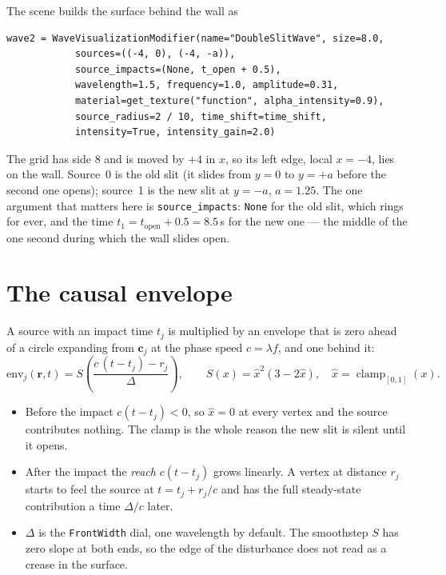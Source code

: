 \documentclass[11pt,a4paper]{article}
\newcommand{\node}[1]{\texttt{#1}}
\newcommand{\clamp}{\operatorname{clamp}}
\begin{document}
The scene builds the surface behind the wall as
\begin{verbatim}
wave2 = WaveVisualizationModifier(name="DoubleSlitWave", size=8.0,
            sources=((-4, 0), (-4, -a)),
            source_impacts=(None, t_open + 0.5),
            wavelength=1.5, frequency=1.0, amplitude=0.31,
            material=get_texture("function", alpha_intensity=0.9),
            source_radius=2 / 10, time_shift=time_shift,
            intensity=True, intensity_gain=2.0)
\end{verbatim}
The grid has side 8 and is moved by $+4$ in $x$, so its left edge, local
$x=-4$, lies on the wall. Source~0 is the old slit (it slides from $y=0$ to
$y=+a$ before the second one opens); source~1 is the new slit at $y=-a$,
$a=1.25$. The one argument that matters here is
\node{source\_impacts}: \node{None} for the old slit, which rings for ever,
and the time $t_1=t_\text{open}+0.5=8.5\,$s for the new one --- the middle of
the one second during which the wall slides open.

\section{The causal envelope}

A source with an impact time $t_j$ is multiplied by an envelope that is
zero ahead of a circle expanding from $\mathbf c_j$ at the phase speed
$c=\lambda f$, and one behind it:
\begin{equation}
  \mathrm{env}_j(\mathbf r,t)=S\!\left(\frac{c\,(t-t_j)-r_j}{\Delta}\right),
  \qquad S(x)=\hat x^{2}(3-2\hat x),\quad \hat x=\clamp_{[0,1]}(x).
  \label{eq:env}
\end{equation}
\begin{itemize}[leftmargin=*]
  \item Before the impact $c(t-t_j)<0$, so $\hat x=0$ at every vertex and the
        source contributes nothing. The clamp is the whole reason the new slit
        is silent until it opens.
  \item After the impact the \emph{reach} $c(t-t_j)$ grows linearly. A vertex
        at distance $r_j$ starts to feel the source at $t=t_j+r_j/c$ and has
        the full steady-state contribution a time $\Delta/c$ later.
  \item $\Delta$ is the \node{FrontWidth} dial, one wavelength by default.
        The smoothstep $S$ has zero slope at both ends, so the edge of the
        disturbance does not read as a crease in the surface.
\end{itemize}
\end{document}
